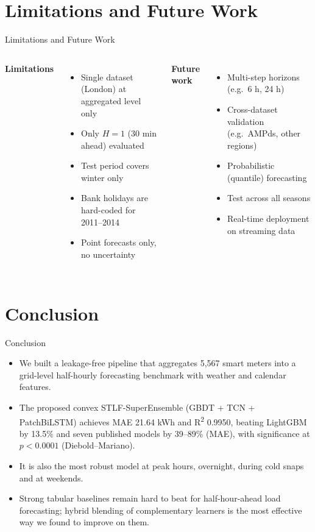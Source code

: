 \documentclass[aspectratio=169]{beamer}
\begin{document}
\section{Limitations and Future Work}
\begin{frame}{Limitations and Future Work}
  \begin{columns}[T]
    \textbf{Limitations}
    \begin{itemize}
      \item Single dataset (London) at aggregated level only
      \item Only $H=1$ (30 min ahead) evaluated
      \item Test period covers winter only
      \item Bank holidays are hard-coded for 2011--2014
      \item Point forecasts only, no uncertainty
    \end{itemize}
    \textbf{Future work}
    \begin{itemize}
      \item Multi-step horizons (e.g.\ 6 h, 24 h)
      \item Cross-dataset validation (e.g.\ AMPds, other regions)
      \item Probabilistic (quantile) forecasting
      \item Test across all seasons
      \item Real-time deployment on streaming data
    \end{itemize}
  \end{columns}
\end{frame}

\section{Conclusion}
\begin{frame}{Conclusion}
  \begin{itemize}
    \item We built a leakage-free pipeline that aggregates 5,567 smart meters into a grid-level half-hourly forecasting benchmark with weather and calendar features.
    \item The proposed convex STLF-SuperEnsemble (GBDT + TCN + PatchBiLSTM) achieves MAE 21.64 kWh and R\textsuperscript{2} 0.9950, beating LightGBM by 13.5\% and seven published models by 39--89\% (MAE), with significance at $p<0.0001$ (Diebold--Mariano).
    \item It is also the most robust model at peak hours, overnight, during cold snaps and at weekends.
    \item Strong tabular baselines remain hard to beat for half-hour-ahead load forecasting; hybrid blending of complementary learners is the most effective way we found to improve on them.
  \end{itemize}
\end{frame}
\end{document}
